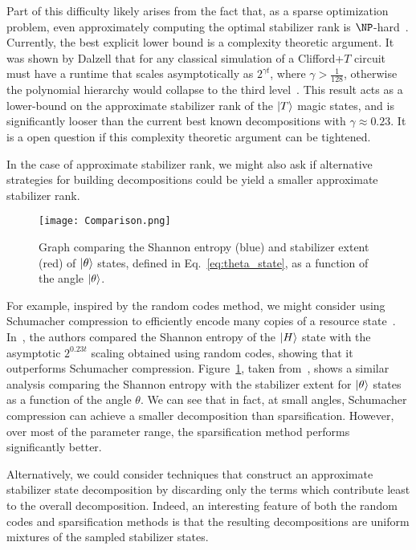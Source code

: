 Part of this difficulty likely arises from the fact that, as a sparse optimization problem, even approximately computing the optimal stabilizer rank is $\NP$-hard~\cite{Natarajan1995}. Currently, the best explicit lower bound is a complexity theoretic argument. It was shown by Dalzell that for any classical simulation of a Clifford+$T$ circuit must have a runtime that scales asymptotically as $2^{\gamma t}$, where $\gamma > \frac{1}{128}$, otherwise the polynomial hierarchy would collapse to the third level~\cite{Dalzell2017}. This result acts as a lower-bound on the approximate stabilizer rank of the $\ket{T}$ magic states, and is significantly looser than the current best known decompositions with $\gamma\approx 0.23$. It is a open question if this complexity theoretic argument can be tightened.\par
In the case of approximate stabilizer rank, we might also ask if alternative strategies for building decompositions could be yield a smaller approximate stabilizer rank.\par
\begin{figure}[b]
\centering
\texttt{[image: Comparison.png]}
\caption{Graph comparing the Shannon entropy (blue) and stabilizer extent (red) of $\ket{\theta}$ states, defined in Eq.~\ref{eq:theta_state}, as a function of the angle $\ket{\theta}$.}
\label{fig:compression_comparison}
\end{figure}
For example, inspired by the random codes method, we might consider using Schumacher compression to efficiently encode many copies of a resource state~\cite{Schumacher1995}. In~\cite{Bravyi2016}, the authors compared the Shannon entropy of the $\ket{H}$ state with the asymptotic $2^{0.23t}$ scaling obtained using random codes, showing that it outperforms Schumacher compression. Figure~\ref{fig:compression_comparison}, taken from~\cite{Bravyi2017}, shows a similar analysis comparing the Shannon entropy with the stabilizer extent for $\ket{\theta}$ states as a function of the angle $\theta$. We can see that in fact, at small angles, Schumacher compression can achieve a smaller decomposition than sparsification. However, over most of the parameter range, the sparsification method performs significantly better.\par
Alternatively, we could consider techniques that construct an approximate stabilizer state decomposition by discarding only the terms which contribute least to the overall decomposition. Indeed, an interesting feature of both the random codes and sparsification methods is that the resulting decompositions are uniform mixtures of the sampled stabilizer states.\par
